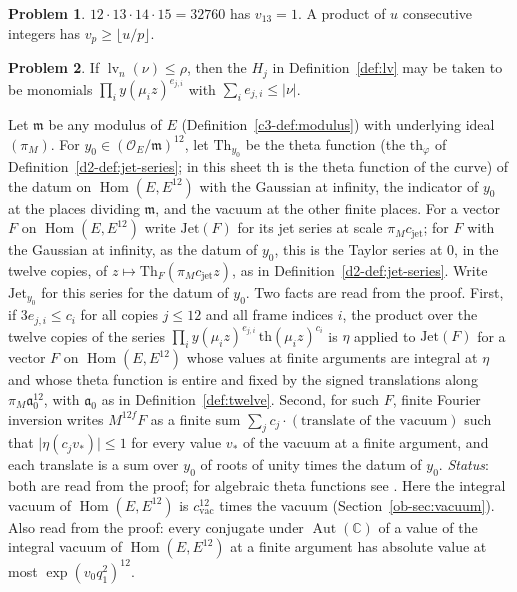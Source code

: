 \documentclass[reqno]{amsart}
\theoremstyle{definition}
\newtheorem{problem}{Problem}[section]
\theoremstyle{plain}
\newcommand{\C}{\mathbb{C}}
\newcommand{\Oc}{\mathcal{O}}
\newcommand{\lv}{\operatorname{lv}}
\newcommand{\Aut}{\operatorname{Aut}}
\newcommand{\Hom}{\operatorname{Hom}}
\newcommand{\cvac}{c_{\mathrm{vac}}}
\newcommand{\cjet}{c_{\mathrm{jet}}}
\newcommand{\Jet}{\mathrm{Jet}}
\newcommand{\Th}{\mathrm{Th}}
\newcommand{\tth}{\mathrm{th}}
\begin{document}
\begin{problem}\label{pr:loss-product}
\(12\cdot13\cdot14\cdot15 = 32760\) has \(v_{13} = 1\).  A product of \(u\) consecutive integers has \(v_p \ge \lfloor u/p\rfloor\).
\end{problem}

\begin{problem}\label{pr:monomial-witness}
If \(\lv_n(\nu) \le \rho\), then the \(H_j\) in Definition~\ref{def:lv} may be taken to be monomials \(\prod_i y(\mu_i z)^{e_{j,i}}\) with \(\sum_i e_{j,i} \le \lvert\nu\rvert\).
\end{problem}

Let \(\mathfrak m\) be any modulus of \(E\) (Definition~\ref{c3-def:modulus}) with underlying ideal \((\pi_M)\).  For \(y_0 \in (\Oc_E/\mathfrak m)^{12}\), let \(\Th_{y_0}\) be the theta function (the \(\mathrm{th}_\varphi\) of Definition~\ref{d2-def:jet-series}; in this sheet \(\tth\) is the theta function of the curve) of the datum on \(\Hom(E, E^{12})\) with the Gaussian at infinity, the indicator of \(y_0\) at the places dividing \(\mathfrak m\), and the vacuum at the other finite places.  For a vector \(F\) on \(\Hom(E,E^{12})\) write \(\Jet(F)\) for its jet series at scale \(\pi_M\cjet\); for \(F\) with the Gaussian at infinity, as the datum of \(y_0\), this is the Taylor series at \(0\), in the twelve copies, of \(z \mapsto \Th_F(\pi_M\cjet z)\), as in Definition~\ref{d2-def:jet-series}.  Write \(\Jet_{y_0}\) for this series for the datum of \(y_0\).  Two facts are read from the proof.  First, if \(3e_{j,i} \le c_i\) for all copies \(j \le 12\) and all frame indices \(i\), the product over the twelve copies of the series \(\prod_i y(\mu_i z)^{e_{j,i}}\,\tth(\mu_i z)^{c_i}\) is \(\eta\) applied to \(\Jet(F)\) for a vector \(F\) on \(\Hom(E, E^{12})\) whose values at finite arguments are integral at \(\eta\) and whose theta function is entire and fixed by the signed translations along \(\pi_M\mathfrak a_0^{12}\), with \(\mathfrak a_0\) as in Definition~\ref{def:twelve}.  Second, for such \(F\), finite Fourier inversion writes \(M^{12f}F\) as a finite sum \(\sum_j c_j\cdot(\text{translate of the vacuum})\) such that \(\lvert\eta(c_jv_*)\rvert \le 1\) for every value \(v_*\) of the vacuum at a finite argument, and each translate is a sum over \(y_0\) of roots of unity times the datum of \(y_0\).  \emph{Status}: both are read from the proof; for algebraic theta functions see \cite{BK}.  Here the integral vacuum of \(\Hom(E,E^{12})\) is \(\cvac^{12}\) times the vacuum (Section~\ref{ob-sec:vacuum}).  Also read from the proof: every conjugate under \(\Aut(\C)\) of a value of the integral vacuum of \(\Hom(E, E^{12})\) at a finite argument has absolute value at most \(\exp(v_0q_1^2)^{12}\).
\end{document}
